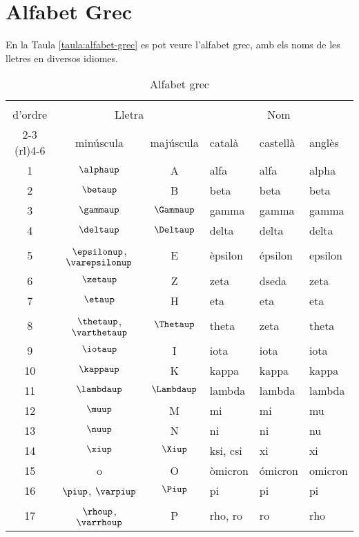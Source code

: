 \chapter{Alfabet Grec} 

 En la Taula \vref{taula:alfabet-grec} es pot veure l'alfabet grec,
 amb els noms de les lletres en diversos idiomes.

\begin{table}[h]
   \caption{\label{taula:alfabet-grec} Alfabet grec}
   \begin{center}\begin{tabular}{ccclll}
   \toprule[1pt]
   \renewcommand*{\multirowsetup}{\centering}
   \multirow{2}{15mm}{\rule{0mm}{4.5mm}N\'{u}mero\\d'ordre} & \multicolumn{2}{c}{Lletra} &
   \multicolumn{3}{c}{Nom} \\
   \cmidrule(rl){2-3} \cmidrule(rl){4-6}
    & min\'{u}scula & maj\'{u}scula & catal\`{a} & castell\`{a} &  angl\`{e}s \\
   \midrule
   1  & $\alphaup$ & A & alfa & alfa &  alpha\\
   2  & $\betaup$ & B & beta & beta &  beta\\
   3  & $\gammaup$ & $\Gammaup$ & gamma & gamma &  gamma\\
   4  & $\deltaup$ & $\Deltaup$ & delta & delta &  delta\\
   5  & $\epsilonup$, $\varepsilonup$ & E & \`{e}psilon & \'{e}psilon &  epsilon\\
   6  & $\zetaup$ & Z & zeta & dseda &  zeta\\
   7  & $\etaup$ & H & eta & eta &  eta\\
   8  & $\thetaup$, $\varthetaup$ & $\Thetaup$ & theta & zeta &  theta\\
   9  & $\iotaup$ & I & iota & iota &  iota\\
   10 & $\kappaup$ & K & kappa & kappa &  kappa\\
   11 & $\lambdaup$ & $\Lambdaup$ & lambda & lambda &  lambda\\
   12 & $\muup$ & M & mi & mi &  mu\\
   13 & $\nuup$ & N & ni & ni &  nu\\
   14 & $\xiup$ & $\Xiup$ & ksi, csi & xi &  xi\\
   15 & o & O & \`{o}micron & \'{o}micron &  omicron\\
   16 & $\piup$, $\varpiup$ & $\Piup$ & pi & pi &  pi\\
   17 & $\rhoup$, $\varrhoup$ & P & rho, ro & ro &  rho\\

\end{tabular}
\end{center}
\end{table}
